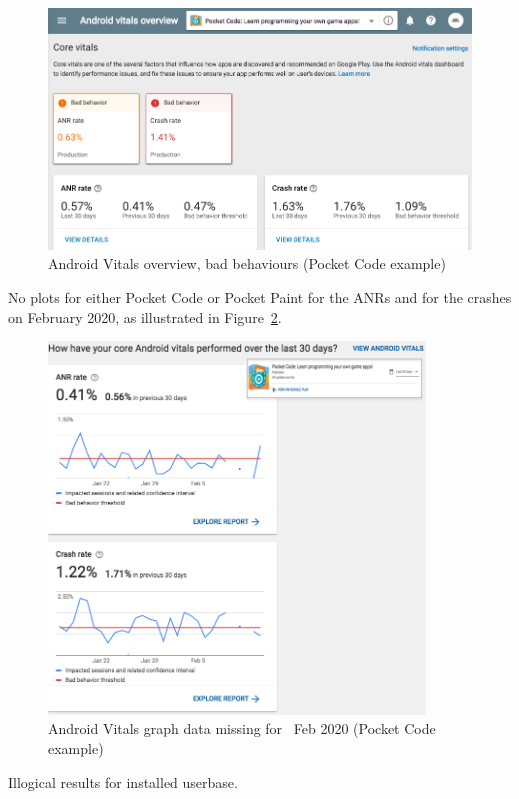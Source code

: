 \begin{figure}
    \centering
    \includegraphics[width=12cm]{images/google-play-console/android-vitals-pocketcode-alerts-23-jan-2020.png}
    \caption{Android Vitals overview, bad behaviours (Pocket Code example)}
    \label{fig:android-vitals-pocketcode-alerts-23-jan-2020}
\end{figure}

No plots for either Pocket Code or Pocket Paint for the ANRs and for the crashes on  February 2020, as illustrated in Figure~\ref{fig:android-vitals-pocketcode-broken-graph-10-feb-2020}. 

\begin{figure}
    \centering
    \includegraphics[width=10cm]{images/google-play-console/android-vitals-pocketcode-broken-graph-10-feb-2020.png}
    \caption{Android Vitals graph data missing for~ Feb 2020 (Pocket Code example)}
    \label{fig:android-vitals-pocketcode-broken-graph-10-feb-2020}
\end{figure}
Illogical results for installed userbase. %


